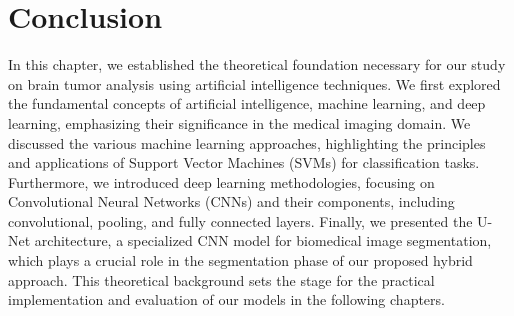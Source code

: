 \section{Conclusion}
\label{sec:conclusion}

In this chapter, we established the theoretical foundation necessary for our study on brain tumor analysis using artificial intelligence techniques. We first explored the fundamental concepts of artificial intelligence, machine learning, and deep learning, emphasizing their significance in the medical imaging domain. We discussed the various machine learning approaches, highlighting the principles and applications of Support Vector Machines (SVMs) for classification tasks. Furthermore, we introduced deep learning methodologies, focusing on Convolutional Neural Networks (CNNs) and their components, including convolutional, pooling, and fully connected layers. Finally, we presented the U-Net architecture, a specialized CNN model for biomedical image segmentation, which plays a crucial role in the segmentation phase of our proposed hybrid approach. This theoretical background sets the stage for the practical implementation and evaluation of our models in the following chapters.
